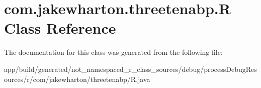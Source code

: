\hypertarget{classcom_1_1jakewharton_1_1threetenabp_1_1_r}{}\section{com.\+jakewharton.\+threetenabp.\+R Class Reference}
\label{classcom_1_1jakewharton_1_1threetenabp_1_1_r}


The documentation for this class was generated from the following file\+:\begin{DoxyCompactItemize}
\item 
app/build/generated/not\+\_\+namespaced\+\_\+r\+\_\+class\+\_\+sources/debug/process\+Debug\+Resources/r/com/jakewharton/threetenabp/R.\+java\end{DoxyCompactItemize}
